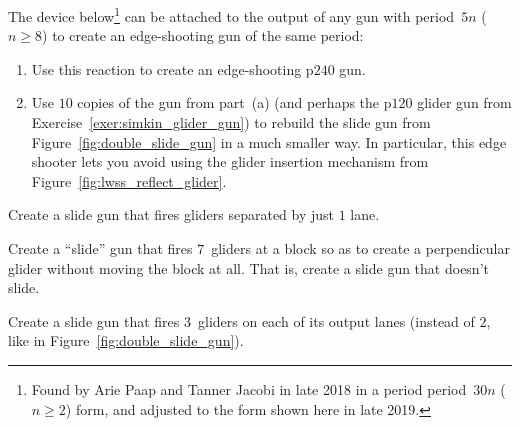 \begin{multicols}{2}
\mfilbreak


\begin{problem}\label{exer:edge_shoot_30n}
	The device below\footnote{Found by Arie Paap and Tanner Jacobi in late 2018 in a period period~$30n$ ($n \geq 2$) form, and adjusted to the form shown here in late 2019.} can be attached to the output of any gun with period~$5n$ ($n \geq 8$) to create an edge-shooting gun of the same period:
	\begin{center}
	\end{center}

	\begin{enumerate}[label=\bf\color{ocre}(\alph*)]
		\item Use this reaction to create an edge-shooting p$240$ gun.
	
		\item Use $10$ copies of the gun from part~(a) (and perhaps the p$120$ glider gun from Exercise~\ref{exer:simkin_glider_gun}) to rebuild the slide gun from Figure~\ref{fig:double_slide_gun} in a much smaller way. In particular, this edge shooter lets you avoid using the glider insertion mechanism from Figure~\ref{fig:lwss_reflect_glider}.
	\end{enumerate}
\end{problem}


\mfilbreak


\begin{problem}\label{exer:slide_gun_hd}
	Create a slide gun that fires gliders separated by just $1$ lane.
	
\end{problem}


\mfilbreak


\begin{problem}\label{exer:slide_gun_no_slide}
	Create a ``slide'' gun that fires $7$~gliders at a block so as to create a perpendicular glider without moving the block at all. That is, create a slide gun that doesn't slide.
\end{problem}


\mfilbreak


\begin{problem}\label{exer:triple_slide_gun}
	Create a slide gun that fires $3$~gliders on each of its output lanes (instead of $2$, like in Figure~\ref{fig:double_slide_gun}).
	

\end{problem}
\end{multicols}
